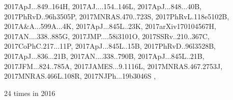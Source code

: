 \documentclass[12pt]{article}
\begin{document}
\begin{description}
{2017ApJ...849..164H,%
2017AJ....154..146L,%
2017ApJ...848...40B,%
2017PhRvD..96h3505P,%
2017MNRAS.470..723S,%
2017PhRvL.118e5102B,%
2017A&A...599A...4K,%
2017ApJ...845L..23K,%
2017arXiv170104567H,%
2017AN....338..885G,%
2017JMP....58i3101O,%
2017SSRv..210..367C,%
2017CoPhC.217...11P,%
2017ApJ...845L..15B,%
2017PhRvD..96l3528B,%
2017ApJ...836...21B,%
2017AN....338..790B,%
2017ApJ...845L..21B,%
2017JFM...824..785A,%
2017JAMES...9.1116L,%
2017MNRAS.467.2753J,%
2017MNRAS.466L.108R,%
2017NJPh...19b3046S%
},\item
24 times in 2016 \citep{
2016PhRvL.116j1101C,%
2016MNRAS.462.4402C,%
2016ApJ...833...43C,%
2016ApJ...832..150C,%
}
\end{description}
\end{document}
